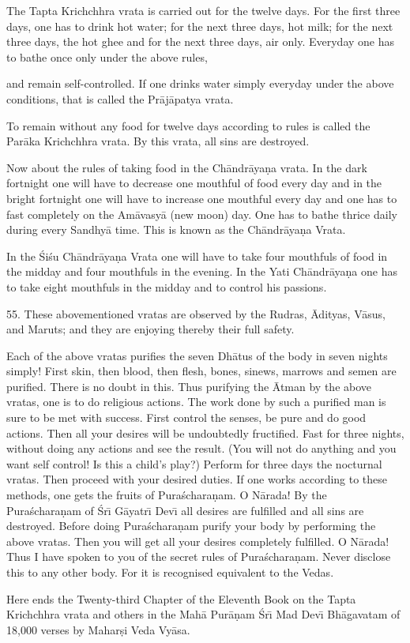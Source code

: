 The Tapta Krichchhra vrata is carried out for the twelve days. For the first three days, one has to drink hot water; for the next three days, hot milk; for the next three days, the hot ghee and for the next three days, air only. Everyday one has to bathe once only under the above rules,

and remain self-controlled. If one drinks water simply everyday under the above conditions, that is called the Pr\=aj\=apatya vrata.

To remain without any food for twelve days according to rules is called the Par\=aka Krichchhra vrata. By this vrata, all sins are destroyed.

Now about the rules of taking food in the Ch\=andr\=aya\d{n}a vrata. In the dark fortnight one will have to decrease one mouthful of food every day and in the bright fortnight one will have to increase one mouthful every day and one has to fast completely on the Am\=avasy\=a (new moon) day. One has to bathe thrice daily during every Sandhy\=a time. This is known as the Ch\=andr\=aya\d{n}a Vrata.

In the \'Si\'su Ch\=andr\=aya\d{n}a Vrata one will have to take four mouthfuls of food in the midday and four mouthfuls in the evening. In the Yati Ch\=andr\=aya\d{n}a one has to take eight mouthfuls in the midday and to control his passions.

55. These abovementioned vratas are observed by the Rudras, \=Adityas, V\=asus, and Maruts; and they are enjoying thereby their full safety.

Each of the above vratas purifies the seven Dh\=atus of the body in seven nights simply! First skin, then blood, then flesh, bones, sinews, marrows and semen are purified. There is no doubt in this. Thus purifying the \=Atman by the above vratas, one is to do religious actions. The work done by such a purified man is sure to be met with success. First control the senses, be pure and do good actions. Then all your desires will be undoubtedly fructified. Fast for three nights, without doing any actions and see the result. (You will not do anything and you want self control! Is this a child's play?) Perform for three days the nocturnal vratas. Then proceed with your desired duties. If one works according to these methods, one gets the fruits of Pura\'schara\d{n}am. O N\=arada! By the Pura\'schara\d{n}am of \'Sr\={\i} G\=ayatr\={\i} Dev\={\i} all desires are fulfilled and all sins are destroyed. Before doing Pura\'schara\d{n}am purify your body by performing the above vratas. Then you will get all your desires completely fulfilled. O N\=arada! Thus I have spoken to you of the secret rules of Pura\'schara\d{n}am. Never disclose this to any other body. For it is recognised equivalent to the Vedas.

Here ends the Twenty-third Chapter of the Eleventh Book on the Tapta Krichchhra vrata and others in the Mah\=a Pur\=a\d{n}am \'Sr\={\i} Mad Dev\={\i} Bh\=agavatam of 18,000 verses by Mahar\d{s}i Veda Vy\=asa.




